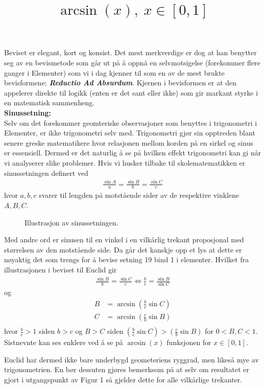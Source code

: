 \documentclass[12pt,
               a4paper,
               article,
               oneside,
               oldfontcommands,
               norsk]{memoir}
\begin{document}
Beviset er elegant, kort og konsist. Det mest merkverdige er dog at han benytter seg av en bevismetode som går ut på å oppnå en selvmotsigelse (forekommer flere ganger i Elementer) som vi i dag kjenner til som en av de mest brukte bevisformene; \emph{\textbf{Reductio Ad Absurdum}}. Kjernen i bevisformen er at den appelerer direkte til logikk (enten er det sant eller ikke) som gir markant styrke i en matematisk sammenheng. \vspace{4mm}\\ 
\textbf{\large Sinussetning:} \vspace{2mm}\\ 
Selv om det forekommer geomteriske observasjoner som benyttes i trigonometri i Elementer, er ikke trigonometri selv med. Trigonometri gjør sin opptreden blant senere greske matematikere hvor relasjonen mellom korden på en sirkel og sinus er essensiell. Dermed er det naturlig å se på hvilken effekt trigonometri kan gi når vi analyserer slike problemer. Hvis vi husker tilbake til skolematematikken er sinussetningen definert ved 
\begin{align*}
  \frac{\sin A}{a} =  \frac{\sin B}{b} =  \frac{\sin C}{c} 
\end{align*} 
hvor $a, b, c$ svarer til lengden på motstående sider av de respektive vinklene $A, B, C$.
\begin{figure}[H]
  \centering 
  
  \caption{Illustrasjon av sinussetningen.}
\end{figure}
Med andre ord er sinusen til en vinkel i en vilkårlig trekant proposjonal med størrelsen av den motstående side. Da går det kanskje opp et lys at dette er nøyaktig det som trengs for å bevise setning 19 bind 1 i elementer. Hvilket fra illustrasjonen i beviset til Euclid gir
\begin{align*}
\frac{\sin B}{b} = \frac{\sin C}{c} \iff \frac{b}{c} = \frac{\sin B}{\sin C}  
\end{align*}
og 
\begin{align*}
 B &= \arcsin \left( \frac{b}{c} \sin C\right) \\[5pt]
 C &= \arcsin \left( \frac{c}{b} \sin B\right) \\[5pt]
\end{align*}
hvor $\frac{b}{c} > 1$ siden $b > c$ og $B > C$ siden $\left( \frac{b}{c} \sin C\right) > \left( \frac{c}{b} \sin B\right)$ for $0 < B,C < 1$. Sistnevnte kan ses enklere ved å se på $\arcsin(x)$ funksjonen for $x \in [0, 1]$.
\begin{figure}[H]
\centering
\title*{$\arcsin(x), \ x \in [0, 1]$}

\end{figure}
Euclid har dermed ikke bare underbygd geometeriens ryggrad, men likeså mye av trigonometrien. En bør dessuten gjøres bemerksom på at selv om resultatet er gjort i utgangspunkt av Figur 1 så gjelder dette for alle vilkårlige trekanter. 
\end{document}
